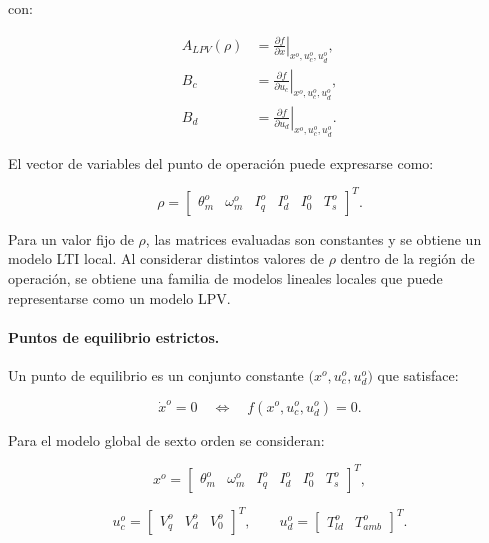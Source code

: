 \documentclass[10pt,a4paper]{article}
\begin{document}
con:

\begin{equation}
	\begin{aligned}
		A_{LPV}(\rho)
		&=
		\left.
		\frac{\partial f}{\partial x}
		\right|_{x^o,u_c^o,u_d^o},\\
		B_c
		&=
		\left.
		\frac{\partial f}{\partial u_c}
		\right|_{x^o,u_c^o,u_d^o},\\
		B_d
		&=
		\left.
		\frac{\partial f}{\partial u_d}
		\right|_{x^o,u_c^o,u_d^o}.
	\end{aligned}
	\label{eq:definicion_jacobianos_lpv}
\end{equation}

El vector de variables del punto de operación puede expresarse como:

\begin{equation}
	\rho=
	\begin{bmatrix}
		\theta_m^o &
		\omega_m^o &
		I_q^o &
		I_d^o &
		I_0^o &
		T_s^o
	\end{bmatrix}^{T}.
	\label{eq:vector_programacion_lpv}
\end{equation}

Para un valor fijo de $\rho$, las matrices evaluadas son constantes y se obtiene un modelo LTI local. Al considerar distintos valores de $\rho$ dentro de la región de operación, se obtiene una familia de modelos lineales locales que puede representarse como un modelo LPV. 

\paragraph{Puntos de equilibrio estrictos.}
Un punto de equilibrio es un conjunto constante
$\bigl(x^o,u_c^o,u_d^o\bigr)$
que satisface:

\begin{equation}
	\dot{x}^o=0
	\quad\Longleftrightarrow\quad
	f(x^o,u_c^o,u_d^o)=0.
	\label{eq:definicion_equilibrio_lpv}
\end{equation}

Para el modelo global de sexto orden se consideran:

\begin{equation}
	x^o=
	\begin{bmatrix}
		\theta_m^o &
		\omega_m^o &
		I_q^o &
		I_d^o &
		I_0^o &
		T_s^o
	\end{bmatrix}^{T},
\end{equation}

\begin{equation}
	u_c^o=
	\begin{bmatrix}
		V_q^o &
		V_d^o &
		V_0^o
	\end{bmatrix}^{T},
	\qquad
	u_d^o=
	\begin{bmatrix}
		T_{ld}^o &
		T_{amb}^o
	\end{bmatrix}^{T}.
\end{equation}
\end{document}
